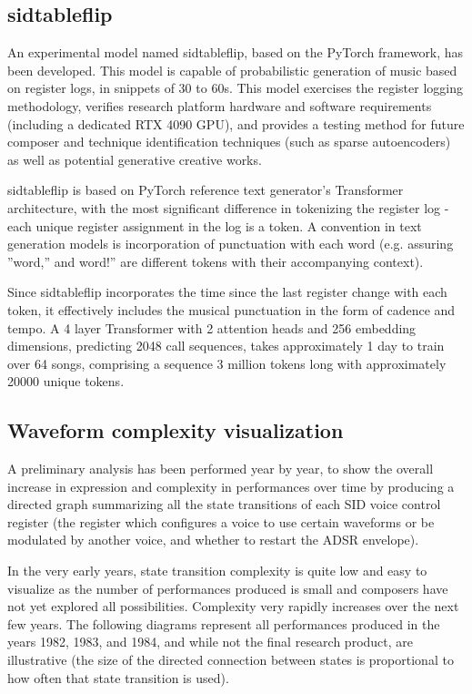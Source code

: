 \documentclass[10pt]{article}
\begin{document}
\begin{multicols*}{2}
\subsection{sidtableflip}
\label{sidtableflip}

An experimental model named sidtableflip\cite{sidtableflip}, based on the PyTorch framework, has been developed. This model is capable of probabilistic generation of music based on register logs, in snippets of 30 to 60s. This model exercises the register logging methodology, verifies research platform hardware and software requirements (including a dedicated RTX 4090 GPU), and provides a testing method for future composer and technique identification techniques (such as sparse autoencoders)  as well as potential generative creative works.

sidtableflip is based on PyTorch reference text generator’s Transformer architecture\cite{pytexample}, with the most significant difference in tokenizing the register log - each unique register assignment in the log is a token. A convention in text generation models is incorporation of punctuation with each word (e.g. assuring ”word,” and word!” are different tokens with their accompanying context).

Since sidtableflip incorporates the time since the last register change with each token, it effectively includes the musical punctuation in the form of cadence and tempo. A 4 layer Transformer with 2 attention heads and 256 embedding dimensions, predicting 2048 call sequences, takes approximately 1 day to train over 64 songs, comprising a sequence 3 million tokens long with approximately 20000 unique tokens.

\subsection{Waveform complexity visualization}
\label{complexity}

A preliminary analysis has been performed year by year, to show the overall increase in expression and complexity in performances over time by producing a directed graph summarizing all the state transitions of each SID voice control register (the register which configures a voice to use certain waveforms or be modulated by another voice, and whether to restart the ADSR envelope).

In the very early years, state transition complexity is quite low and easy to visualize as the number of performances produced is small and composers have not yet explored all possibilities. Complexity very rapidly increases over the next few years. The following diagrams represent all performances produced in the years 1982, 1983, and 1984, and while not the final research product, are illustrative (the size of the directed connection between states is proportional to how often that state transition is used).


\end{multicols*}
\end{document}
